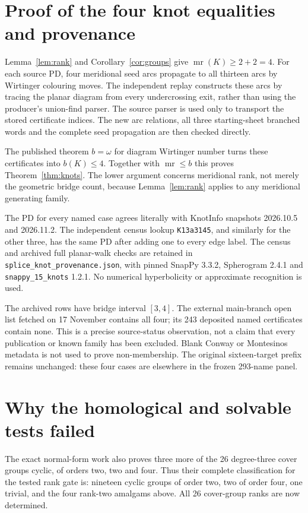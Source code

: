 \documentclass[11pt]{article}
\newcommand{\mr}{\operatorname{mr}}
\begin{document}
\section{Proof of the four knot equalities and provenance}

Lemma~\ref{lem:rank} and Corollary~\ref{cor:groups} give
$\mr(K)\ge2+2=4$. For each source PD, four meridional seed arcs
propagate to all thirteen arcs by Wirtinger colouring moves.
The independent replay constructs these arcs by tracing the
planar diagram from every undercrossing exit, rather than
using the producer's union-find parser. The source parser is
used only to transport the stored certificate indices. The
new arc relations, all three starting-sheet branched words
and the complete seed propagation are then checked directly.

The published theorem $b=\omega$ for diagram Wirtinger number
\cite{wirt} turns these certificates into $b(K)\le4$.
Together with $\mr\le b$ this proves Theorem~\ref{thm:knots}.
The lower argument concerns meridional rank, not merely the
geometric bridge count, because Lemma~\ref{lem:rank} applies
to any meridional generating family.

The PD for every named case agrees literally with KnotInfo
snapshots 2026.10.5 and 2026.11.2. The independent census lookup
\texttt{K13a3145}, and similarly for the other three, has the
same PD after adding one to every edge label. The census and
archived full planar-walk checks are retained in
\texttt{splice\_knot\_provenance.json}, with pinned SnapPy 3.3.2,
Spherogram 2.4.1 and \texttt{snappy\_15\_knots} 1.2.1.
No numerical hyperbolicity or approximate recognition is used.

The archived rows have bridge interval $[3,4]$. The external
main-branch open list fetched on 17 November contains all four;
its 243 deposited named certificates contain none. This is a
precise source-status observation, not a claim that every
publication or known family has been excluded. Blank Conway
or Montesinos metadata is not used to prove non-membership.
The original sixteen-target prefix remains unchanged: these
four cases are elsewhere in the frozen 293-name panel.

\section{Why the homological and solvable tests failed}

The exact normal-form work also proves three more of the
26 degree-three cover groups cyclic, of orders two, two and
four. Thus their complete classification for the tested rank
gate is: nineteen cyclic groups of order two, two of order
four, one trivial, and the four rank-two amalgams above.
All 26 cover-group ranks are now determined.
\end{document}
